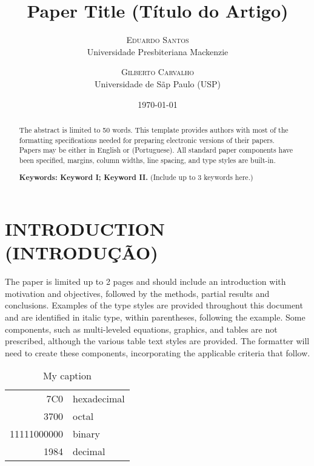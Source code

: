 \documentclass[a4paper,12pt]{article}
\title{Paper Title (Título do Artigo)}
\author{%
	\textsc{Eduardo Santos}\\ %
	\normalsize Universidade Presbiteriana Mackenzie \\ %
	\and
	\textsc{Gilberto Carvalho}\\%
	\normalsize Universidade de Sãp Paulo (USP) \\ %
}
\date{\today}
\begin{document}
	\maketitle
	
	\begin{abstract}
		The abstract is limited to 50 words. This template provides authors with most of the formatting specifications needed for preparing electronic versions of their papers. Papers may be either in English or (Portuguese). All standard paper components have been specified, margins, column widths, line spacing, and type styles are built-in.
	
		\textbf{Keywords: Keyword I; Keyword II.} (Include up to 3 keywords here.)
	\end{abstract}
	
	\section{INTRODUCTION (INTRODUÇÃO)} \label{sec:introduction}
		The paper is limited up to 2 pages and should include an introduction with motivation and objectives, followed by the methods, partial results and conclusions. Examples of the type styles are provided throughout this document and are identified in italic type, within parentheses, following the example. Some components, such as multi-leveled equations, graphics, and tables are not prescribed, although the various table text styles are provided. The formatter will need to create these components, incorporating the applicable criteria that follow.
		
		
		\begin{table}[!htb]
			\centering
			\begin{tabular}{|r|l|}
				\hline
				7C0 & hexadecimal \\
				3700 & octal \\ \cline{2-2}
				11111000000 & binary \\
				\hline \hline
				1984 & decimal \\
				\hline
			\end{tabular}
			\label{tab:table1}
			\caption{My caption}
		\end{table}
	
\end{document}
